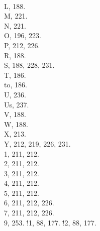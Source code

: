 \:\.{\\L}, 188.
\:\.{\\M}, 221.
\:\.{\\N}, 221.
\:\.{\\O}, 196, 223.
\:\.{\\P}, 212, 226.
\:\.{\\R}, 188.
\:\.{\\S}, 188, 228, 231.
\:\.{\\T}, 186.
\:\.{\\to}, 186.
\:\.{\\U}, 236.
\:\.{\\Us}, 237.
\:\.{\\V}, 188.
\:\.{\\W}, 188.
\:\.{\\X}, 213.
\:\.{\\Y}, 212, 219, 226, 231.
\:\.{\\1}, 211, 212.
\:\.{\\2}, 211, 212.
\:\.{\\3}, 211, 212.
\:\.{\\4}, 211, 212.
\:\.{\\5}, 211, 212.
\:\.{\\6}, 211, 212, 226.
\:\.{\\7}, 211, 212, 226.
\:\.{\\9}, 253.
\:\.{\AT!1}, 88, 177.
\:\.{\AT!2}, 88, 177.
